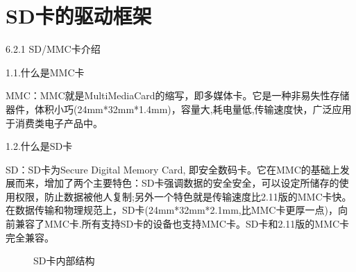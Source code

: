 \section{SD卡的驱动框架}
6.2.1 SD/MMC卡介绍

1.1.什么是MMC卡

MMC：MMC就是MultiMediaCard的缩写，即多媒体卡。它是一种非易失性存储器件，体积小巧(24mm*32mm*1.4mm)，容量大,耗电量低,传输速度快，广泛应用于消费类电子产品中。

1.2.什么是SD卡

SD：SD卡为Secure Digital Memory Card, 即安全数码卡。它在MMC的基础上发展而来，增加了两个主要特色：SD卡强调数据的安全安全，可以设定所储存的使用权限，防止数据被他人复制;另外一个特色就是传输速度比2.11版的MMC卡快。在数据传输和物理规范上，SD卡(24mm*32mm*2.1mm,比MMC卡更厚一点)，向前兼容了MMC卡.所有支持SD卡的设备也支持MMC卡。SD卡和2.11版的MMC卡完全兼容。
\begin{figure}[H]
    \centering
    \caption{SD卡内部结构}
\end{figure}


